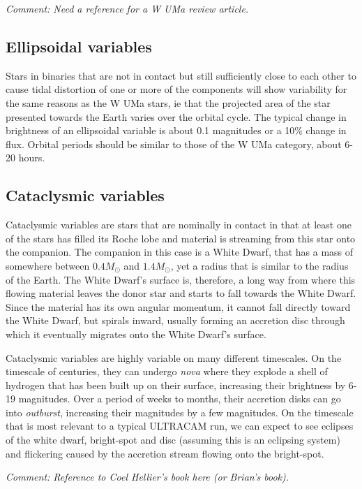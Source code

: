 \emph{Comment: Need a reference for a {W UMa} review article.}

\subsection{Ellipsoidal variables}
Stars in binaries that are not in contact but still sufficiently close to each other to cause tidal distortion of one or more of the components will show variability for the same reasons as the {W UMa} stars, ie that the projected area of the star presented towards the Earth varies over the orbital cycle. The typical change in brightness of an ellipsoidal variable is about 0.1 magnitudes or a 10\% change in flux. Orbital periods should be similar to those of the {W UMa} category, about 6-20 hours. 

\subsection{Cataclysmic variables}
Cataclysmic variables are stars that are nominally in contact in that at least one of the stars has filled its Roche lobe and material is streaming from this star onto the companion. The companion in this case is a White Dwarf, that has a mass of somewhere between $0.4 M_{\odot}$ and $1.4 M_{\odot}$, yet a radius that is similar to the radius of the Earth. The White Dwarf's surface is, therefore, a long way from where this flowing material leaves the donor star and starts to fall towards the White Dwarf. Since the material has its own angular momentum, it cannot fall directly toward the White Dwarf, but spirals inward, usually forming an accretion disc through which it eventually migrates onto the White Dwarf's surface. 

Cataclysmic variables are highly variable on many different timescales. On the timescale of centuries, they can undergo \emph{nova} where they explode a shell of hydrogen that has been built up on their surface, increasing their brightness by 6-19 magnitudes. Over a period of weeks to months, their accretion disks can go into \emph{outburst}, increasing their magnitudes by a few magnitudes. On the timescale that is most relevant to a typical ULTRACAM run, we can expect to see eclipses of the white dwarf, bright-spot and disc (assuming this is an eclipsing system) and flickering caused by the accretion stream flowing onto the bright-spot. 

\emph{Comment: Reference to Coel Hellier's book here (or Brian's book). }

